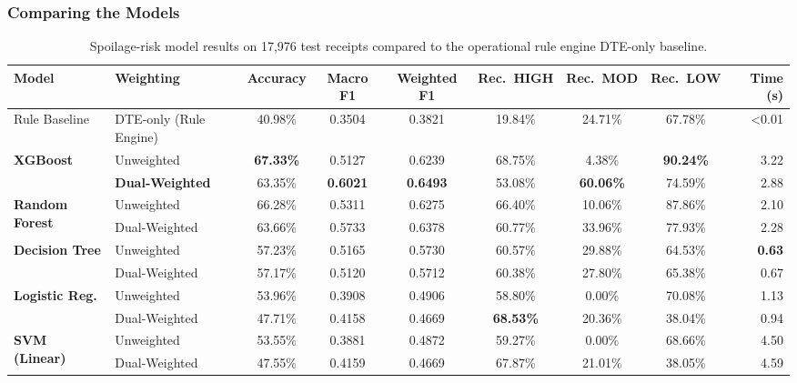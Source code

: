 \documentclass[12pt,a4paper]{article}
\renewcommand{\_}{\oldunderscore\allowbreak}
\begin{document}
\subsubsection{Comparing the Models}
\begin{table}[H]
\centering
\caption{Spoilage-risk model results on 17,976 test receipts compared to the operational rule engine DTE-only baseline.}
\label{tab:spoilage_ablation_summary}
\renewcommand{\arraystretch}{1.12}
\setlength{\tabcolsep}{3.5pt}
{\scriptsize
\begin{tabular}{@{} l l c c c c c c r @{}}
\toprule
\rowcolor{NavyPrimary}
\color{white}\textbf{Model} & \color{white}\textbf{Weighting} & \color{white}\textbf{Accuracy} & \color{white}\textbf{Macro F1} & \color{white}\textbf{Weighted F1} & \color{white}\textbf{Rec.\ HIGH} & \color{white}\textbf{Rec.\ MOD} & \color{white}\textbf{Rec.\ LOW} & \color{white}\textbf{Time (s)} \\
\midrule
Rule Baseline & DTE-only (Rule Engine) & 40.98\% & 0.3504 & 0.3821 & 19.84\% & 24.71\% & 67.78\% & <0.01 \\
\midrule
\multirow{2}{*}{\textbf{XGBoost}} & Unweighted & \textbf{67.33\%} & 0.5127 & 0.6239 & 68.75\% & 4.38\% & \textbf{90.24\%} & 3.22 \\
 & \textbf{Dual-Weighted} & 63.35\% & \textbf{0.6021} & \textbf{0.6493} & 53.08\% & \textbf{60.06\%} & 74.59\% & 2.88 \\
\midrule
\multirow{2}{*}{\textbf{Random Forest}} & Unweighted & 66.28\% & 0.5311 & 0.6275 & 66.40\% & 10.06\% & 87.86\% & 2.10 \\
 & Dual-Weighted & 63.66\% & 0.5733 & 0.6378 & 60.77\% & 33.96\% & 77.93\% & 2.28 \\
\midrule
\multirow{2}{*}{\textbf{Decision Tree}} & Unweighted & 57.23\% & 0.5165 & 0.5730 & 60.57\% & 29.88\% & 64.53\% & \textbf{0.63} \\
 & Dual-Weighted & 57.17\% & 0.5120 & 0.5712 & 60.38\% & 27.80\% & 65.38\% & 0.67 \\
\midrule
\multirow{2}{*}{\textbf{Logistic Reg.}} & Unweighted & 53.96\% & 0.3908 & 0.4906 & 58.80\% & 0.00\% & 70.08\% & 1.13 \\
 & Dual-Weighted & 47.71\% & 0.4158 & 0.4669 & \textbf{68.53\%} & 20.36\% & 38.04\% & 0.94 \\
\midrule
\multirow{2}{*}{\textbf{SVM (Linear)}} & Unweighted & 53.55\% & 0.3881 & 0.4872 & 59.27\% & 0.00\% & 68.66\% & 4.50 \\
 & Dual-Weighted & 47.55\% & 0.4159 & 0.4669 & 67.87\% & 21.01\% & 38.05\% & 4.59 \\
\bottomrule
\end{tabular}}
\end{table}
\end{document}
